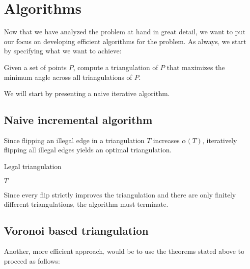 \section{Algorithms}
    Now that we have analyzed the problem at hand in great detail, we want to put our focus on developing efficient algorithms for the problem. As always, we start by specifying what we want to achieve:
    \begin{mdframed}
        Given a set of points $P$, compute a triangulation of $P$ that maximizes the minimum angle across all triangulations of $P$.
    \end{mdframed}
    We will start by presenting a naive iterative algorithm.

    \subsection{Naive incremental algorithm}
        Since flipping an illegal edge in a triangulation $T$ increases $\alpha(T)$, iteratively flipping all illegal edges yields an optimal triangulation.

        \begin{breakablealgorithm}
            \caption{Legal triangulation}
            \label{alg:legal_triangulation}
            \begin{algorithmic}[1]
                    \EndWhile
                    \State \Return $T$
                \EndProcedure
            \end{algorithmic}
        \end{breakablealgorithm}

        Since every flip strictly improves the triangulation and there are only finitely different triangulations, the algorithm must terminate.

    \subsection{Voronoi based triangulation}
        Another, more efficient approach, would be to use the theorems stated above to proceed as follows: \\

